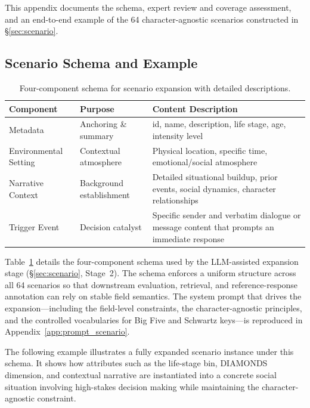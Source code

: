 \documentclass[11pt]{article}
\begin{document}
This appendix documents the schema, expert review and coverage assessment, and an end-to-end example of the 64 character-agnostic scenarios constructed in \S\ref{sec:scenario}.

\subsection{Scenario Schema and Example}
\label{app:scenario_schema}

\begin{table}[!t]
\centering
\caption{Four-component schema for scenario expansion with detailed descriptions.}
\label{tab:scenario_components}
\setlength{\tabcolsep}{2.5pt}
\small
\begin{tabularx}{\textwidth}{p{2.8cm}p{3.1cm}X}
\toprule
\textbf{Component} & \textbf{Purpose} & \textbf{Content Description} \\
\midrule
Metadata & Anchoring \& summary & id, name, description, life stage, age, intensity level \\
\midrule
Environmental Setting & Contextual atmosphere & Physical location, specific time, emotional/social atmosphere \\
\midrule
Narrative Context & Background establishment & Detailed situational buildup, prior events, social dynamics, character relationships \\
\midrule
Trigger Event & Decision catalyst & Specific sender and verbatim dialogue or message content that prompts an immediate response
 \\
\bottomrule
\end{tabularx}
\end{table}

Table~\ref{tab:scenario_components} details the four-component schema used by the LLM-assisted expansion stage (\S\ref{sec:scenario}, Stage~2). The schema enforces a uniform structure across all 64 scenarios so that downstream evaluation, retrieval, and reference-response annotation can rely on stable field semantics. The system prompt that drives the expansion---including the field-level constraints, the character-agnostic principles, and the controlled vocabularies for Big Five and Schwartz keys---is reproduced in Appendix~\ref{app:prompt_scenario}.

\FloatBarrier
The following example illustrates a fully expanded scenario instance under this schema. It shows how attributes such as the life-stage bin, DIAMONDS dimension, and contextual narrative are instantiated into a concrete social situation involving high-stakes decision making while maintaining the character-agnostic constraint.
\label{app:ExampleofScenario}
\end{document}

